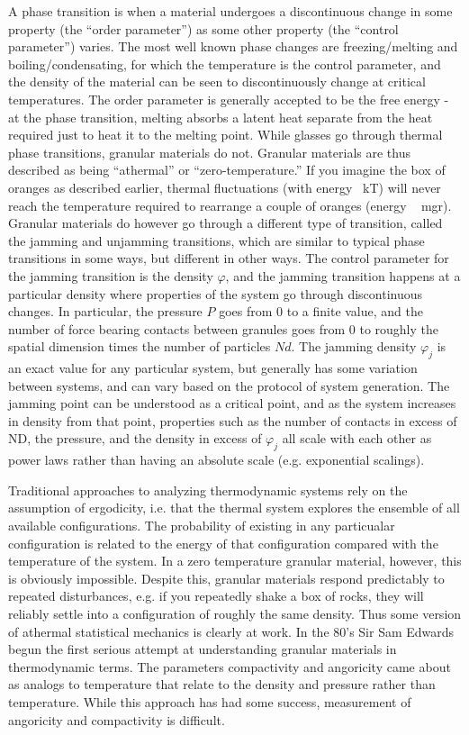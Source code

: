 A phase transition is when a material undergoes a discontinuous change in some property (the ``order parameter'') as some other property (the ``control parameter'') varies. The most well known phase changes are freezing/melting and boiling/condensating, for which the temperature is the control parameter, and the density of the material can be seen to discontinuously change at critical temperatures. The order parameter is generally accepted to be the free energy - at the phase transition, melting absorbs a latent heat separate from the heat required just to heat it to the melting point. While glasses go through thermal phase transitions, granular materials do not. Granular materials are thus described as being ``athermal'' or ``zero-temperature.'' If you imagine the box of oranges as described earlier, thermal fluctuations (with energy ~kT) will never reach the temperature required to rearrange a couple of oranges (energy ~ mgr). Granular materials do however go through a different type of transition, called the jamming and unjamming transitions, which are similar to typical phase transitions in some ways, but different in other ways. The control parameter for the jamming transition is the density $\varphi$, and the jamming transition happens at a particular density where properties of the system go through discontinuous changes. In particular, the pressure $P$ goes from 0 to a finite value, and the number of force bearing contacts between granules goes from 0 to roughly the spatial dimension times the number of particles $Nd$. The jamming density $\varphi_j$ is an exact value for any particular system, but generally has some variation between systems, and can vary based on the protocol of system generation. The jamming point can be understood as a critical point, and as the system increases in density from that point, properties such as the number of contacts in excess of ND, the pressure, and the density in excess of $\varphi_j$ all scale with each other as power laws rather than having an absolute scale (e.g. exponential scalings).

Traditional approaches to analyzing thermodynamic systems rely on the assumption of ergodicity, i.e. that the thermal system explores the ensemble of all available configurations. The probability of existing in any particualar configuration is related to the energy of that configuration compared with the temperature of the system. In a zero temperature granular material, however, this is obviously impossible. Despite this, granular materials respond predictably to repeated disturbances, e.g. if you repeatedly shake a box of rocks, they will reliably settle into a configuration of roughly the same density. Thus some version of athermal statistical mechanics is clearly at work. In the 80's Sir Sam Edwards begun the first serious attempt at understanding granular materials in thermodynamic terms. The parameters compactivity and angoricity came about as analogs to temperature that relate to the density and pressure rather than temperature. While this approach has had some success, measurement of angoricity and compactivity is difficult.

